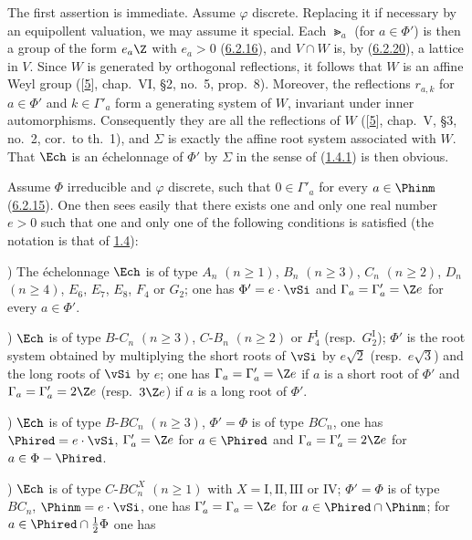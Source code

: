 \documentclass[12pt,a4paper,oneside,english]{smfart}
\makeatletter
\newcommand{\btanchor}[1]{\leavevmode\Hy@raisedlink{\hypertarget{bt:#1}{}}}
\newcommand{\btpageanchor}[1]{\Hy@raisedlink{\hypertarget{p:#1}{}}}
\newcommand{\btref}[1]{\hyperlink{bt:#1}{#1}}
\newcommand{\btbib}[1]{\hyperlink{bib:#1}{#1}}
\newcommand{\btpage}[1]{\marginnote{p.~#1}\btpageanchor{#1}}
\newcommand{\pmark}[1]{\btpage{#1}}
\theoremstyle{definition}
\theoremstyle{bt}
\makeatother
\begin{document}
The first assertion is immediate. Assume $\varphi$ discrete. Replacing it
if necessary by an equipollent valuation, we may assume it special. Each
$\Gt_a$ (for $a\in\Phi'$) is then a group of the form $e_a\Z$ with $e_a>0$
(\btref{6.2.16}), and $V\cap W$ is, by (\btref{6.2.20}), a lattice in $V$. Since $W$ is
generated by orthogonal reflections, it follows that $W$ is an affine Weyl
group ([\btbib{5}], chap.~VI, \S2, no.~5, prop.~8). Moreover, the reflections
$r_{a,k}$ for $a\in\Phi'$ and $k\in\Gamma'_a$ form a generating system of
$W$, invariant under inner automorphisms. Consequently they are all the
reflections of $W$ ([\btbib{5}], chap.~V, \S3, no.~2, cor.\ to th.~1), and $\Sigma$
is exactly the affine root system associated with $W$. That $\Ech$ is an
échelonnage of $\Phi'$ by $\Sigma$ in the sense of (\btref{1.4.1}) is then obvious.

\btanchor{6.2.23}
Assume $\Phi$ irreducible and $\varphi$ discrete, such that $0\in\Gamma'_a$
for every $a\in\Phinm$ (\btref{6.2.15}). One then sees easily that there exists one
and only one real number $e>0$ such that one and only one of the following
conditions is satisfied (the notation is that of \btref{1.4}):

) The échelonnage $\Ech$ is of type $A_n$ $(n\geq1)$, $B_n$ $(n\geq3)$,
$C_n$ $(n\geq2)$, $D_n$ $(n\geq4)$, $E_6$, $E_7$, $E_8$, $F_4$ or $G_2$;
one has $\Phi'=e\cdot\vSi$ and $\Gamma_a=\Gamma'_a=\Z e$ for every
$a\in\Phi'$.

) $\Ech$ is of type $B\text{-}C_n$ $(n\geq3)$, $C\text{-}B_n$ $(n\geq2)$ or
$F_4^{\mathrm{I}}$ (resp.\ $G_2^{\mathrm{I}}$); $\Phi'$ is the root system
obtained by multiplying the short roots of $\vSi$ by $e\sqrt2$ (resp.\
$e\sqrt3$) and the
\pmark{128}
long roots of $\vSi$ by $e$; one has $\Gamma_a=\Gamma'_a=\Z e$ if $a$ is a
short root of $\Phi'$ and $\Gamma_a=\Gamma'_a=2\Z e$ (resp.\ $3\Z e$) if $a$
is a long root of $\Phi'$.

) $\Ech$ is of type $B\text{-}BC_n$ $(n\geq3)$, $\Phi'=\Phi$ is of type
$BC_n$, one has $\Phired=e\cdot\vSi$, $\Gamma'_a=\Z e$ for
$a\in\Phired$ and $\Gamma_a=\Gamma'_a=2\Z e$ for $a\in\Phi-\Phired$.

) $\Ech$ is of type $C\text{-}BC_n^{X}$ $(n\geq1)$ with
$X=\mathrm{I},\mathrm{II},\mathrm{III}$ or $\mathrm{IV}$; $\Phi'=\Phi$ is of
type $BC_n$, $\Phinm=e\cdot\vSi$, one has $\Gamma'_a=\Gamma_a=\Z e$ for
$a\in\Phired\cap\Phinm$; for $a\in\Phired\cap\tfrac12\Phi$ one has
\end{document}
